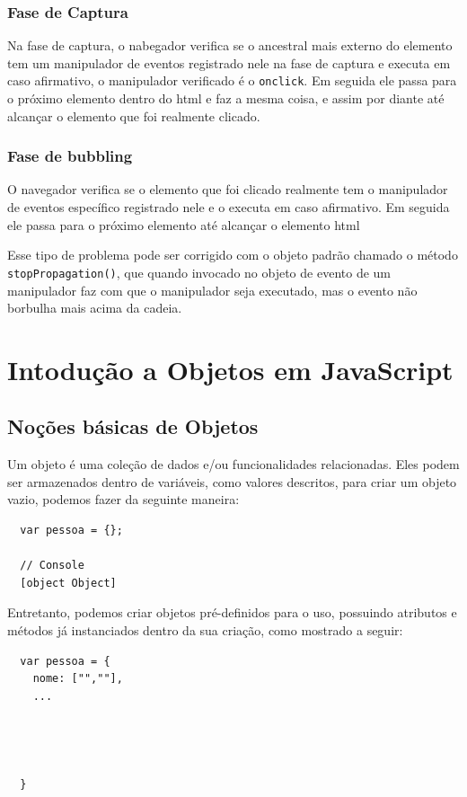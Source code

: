 \documentclass[12pt, a4paper]{paper}
\begin{document}
\subsubsection{Fase de Captura} %
\label{sec:Fase de Captura}
Na fase de captura, o nabegador verifica se o ancestral mais externo do elemento tem 
um manipulador de eventos registrado nele na fase de captura e executa em caso 
afirmativo, o manipulador verificado é o \texttt{onclick}. Em seguida ele passa para 
o próximo elemento dentro do html e faz a mesma coisa, e assim por diante até alcançar o elemento que foi realmente clicado.

\subsubsection{Fase de bubbling} %
\label{sec:Fase de bubbling}
O navegador verifica se o elemento que foi clicado realmente tem o manipulador de 
eventos específico registrado nele e o executa em caso afirmativo. Em seguida ele passa 
para o próximo elemento até alcançar o elemento html

Esse tipo de problema pode ser corrigido com o objeto padrão chamado o método 
\texttt{stopPropagation()}, que quando invocado no objeto de evento de um manipulador 
faz com que o manipulador seja executado, mas o evento não borbulha mais acima da 
cadeia.

\section{Intodução a Objetos em JavaScript} %
\label{sec:Intodução a Objetos em JavaScript}
\subsection{Noções básicas de Objetos} %
\label{sub:Noções básicas de Objetos}
Um objeto é uma coleção de dados e/ou funcionalidades relacionadas. Eles podem ser 
armazenados dentro de variáveis, como valores descritos, para criar um objeto vazio, 
podemos fazer da seguinte maneira: 

\begin{verbatim}
  var pessoa = {};

  // Console
  [object Object]
\end{verbatim}

Entretanto, podemos criar objetos pré-definidos para o uso, possuindo atributos e 
métodos já instanciados dentro da sua criação, como mostrado a seguir: 

\begin{verbatim}
  var pessoa = {
    nome: ["",""],
    ...




  }
\end{verbatim}







\end{document}

